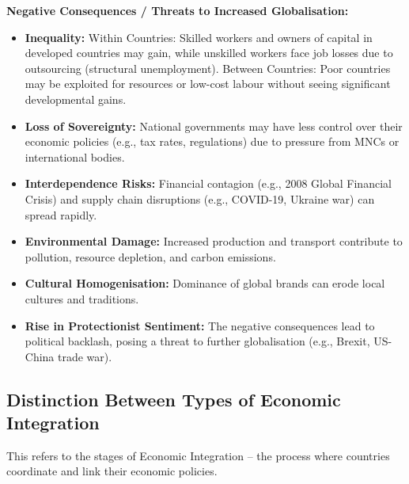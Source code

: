 \documentclass[11pt, a4paper, twoside]{book}
\begin{document}
\textbf{Negative Consequences / Threats to Increased Globalisation:}
\begin{itemize}
  \item \textbf{Inequality:} Within Countries: Skilled workers and owners of capital in developed countries may gain, while unskilled workers face job losses due to outsourcing (structural unemployment). Between Countries: Poor countries may be exploited for resources or low-cost labour without seeing significant developmental gains.
  \item \textbf{Loss of Sovereignty:} National governments may have less control over their economic policies (e.g., tax rates, regulations) due to pressure from MNCs or international bodies.
  \item \textbf{Interdependence Risks:} Financial contagion (e.g., 2008 Global Financial Crisis) and supply chain disruptions (e.g., COVID-19, Ukraine war) can spread rapidly.
  \item \textbf{Environmental Damage:} Increased production and transport contribute to pollution, resource depletion, and carbon emissions.
  \item \textbf{Cultural Homogenisation:} Dominance of global brands can erode local cultures and traditions.
  \item \textbf{Rise in Protectionist Sentiment:} The negative consequences lead to political backlash, posing a threat to further globalisation (e.g., Brexit, US-China trade war).
\end{itemize}

\subsection{Distinction Between Types of Economic Integration}

This refers to the stages of Economic Integration -- the process where countries coordinate and link their economic policies.
\end{document}
